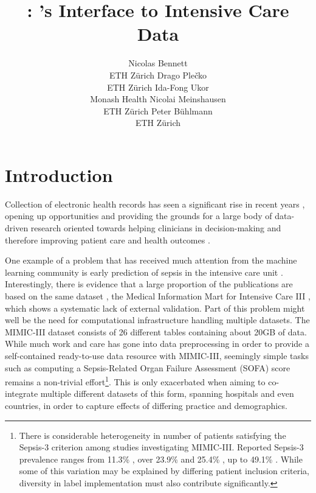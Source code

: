 \documentclass[
  notitle]{jss}
\author{
Nicolas Bennett\footnotemark[1]\\ETH Zürich \And Drago
Plečko\footnotemark[1]\footnotetext[1]{These authors contributed equally.}\\ETH Zürich \And Ida-Fong Ukor\\Monash Health \AND Nicolai Meinshausen\\ETH Zürich \And Peter Bühlmann\\ETH Zürich
}
\title{\pkg{ricu}: \proglang{R}'s Interface to Intensive Care Data}
\begin{document}
\maketitle

\renewcommand*{\thefootnote}{\fnsymbol{footnote}}
\renewcommand*{\thefootnote}{\arabic{footnote}}

\hypertarget{introduction}{%
\section{Introduction}\label{introduction}}

Collection of electronic health records has seen a significant rise in
recent years \citep{evans2016}, opening up opportunities and providing
the grounds for a large body of data-driven research oriented towards
helping clinicians in decision-making and therefore improving patient
care and health outcomes \citep{jiang2017}.

One example of a problem that has received much attention from the
machine learning community is early prediction of sepsis in the
intensive care unit
\citep[ICU;][]{desautels2016, nemati2018, futoma2017, kam2017}.
Interestingly, there is evidence that a large proportion of the
publications are based on the same dataset \citep{fleuren2019}, the
Medical Information Mart for Intensive Care III
\citep[MIMIC-III;][]{johnson2016}, which shows a systematic lack of
external validation. Part of this problem might well be the need for
computational infrastructure handling multiple datasets. The MIMIC-III
dataset consists of 26 different tables containing about 20GB of data.
While much work and care has gone into data preprocessing in order to
provide a self-contained ready-to-use data resource with MIMIC-III,
seemingly simple tasks such as computing a Sepsis-Related Organ Failure
Assessment (SOFA) score \citep{vincent1996} remains a non-trivial
effort\footnote{There is considerable heterogeneity in number of
  patients satisfying the Sepsis-3 criterion
  \citep[of which SOFA provides a major component;][]{singer2016} among
  studies investigating MIMIC-III. Reported Sepsis-3 prevalence ranges
  from 11.3\% \citep{desautels2016}, over 23.9\% \citep{nemati2018} and
  25.4\% \citep{wang2018}, up to 49.1\% \citep{johnson2018}. While some
  of this variation may be explained by differing patient inclusion
  criteria, diversity in label implementation must also contribute
  significantly.}. This is only exacerbated when aiming to co-integrate
multiple different datasets of this form, spanning hospitals and even
countries, in order to capture effects of differing practice and
demographics.
\end{document}
